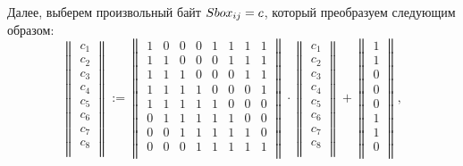     Далее, выберем произвольный байт $S\-box_{ij} = c$, который преобразуем следующим образом:
    \begin{equation}
        \begin{Vmatrix}
            c_1 \\
            c_2 \\
            c_3 \\
            c_4 \\
            c_5 \\
            c_6 \\
            c_7 \\
            c_8 \\
        \end{Vmatrix} :=
        \begin{Vmatrix}
            1 & 0 & 0 & 0 & 1 & 1 & 1 & 1 \\
            1 & 1 & 0 & 0 & 0 & 1 & 1 & 1 \\
            1 & 1 & 1 & 0 & 0 & 0 & 1 & 1 \\
            1 & 1 & 1 & 1 & 0 & 0 & 0 & 1 \\
            1 & 1 & 1 & 1 & 1 & 0 & 0 & 0 \\
            0 & 1 & 1 & 1 & 1 & 1 & 0 & 0 \\
            0 & 0 & 1 & 1 & 1 & 1 & 1 & 0 \\
            0 & 0 & 0 & 1 & 1 & 1 & 1 & 1 \\
        \end{Vmatrix} \cdot
        \begin{Vmatrix}
            c_1 \\
            c_2 \\
            c_3 \\
            c_4 \\
            c_5 \\
            c_6 \\
            c_7 \\
            c_8 \\
        \end{Vmatrix} +
        \begin{Vmatrix}
            1 \\
            1 \\
            0 \\
            0 \\
            0 \\
            1 \\
            1 \\
            0 \\
        \end{Vmatrix},
    \end{equation}

